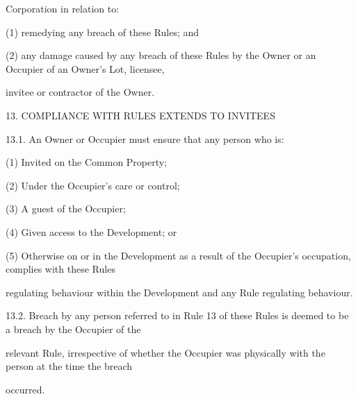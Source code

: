 \documentclass{article}
\begin{document}
{\fontsize{10.02}{1}Corporation in relation to: }

{\fontsize{9.962}{1}(1) remedying any breach of these Rules; and }

{\fontsize{9.962}{1}(2) any damage caused by any breach of these Rules by the Owner or an Occupier of an Owner’s Lot, licensee, }

{\fontsize{10.02}{1}invitee or contractor of the Owner. }



{\fontsize{9.99}{1}13. COMPLIANCE WITH RULES EXTENDS TO INVITEES }

{\fontsize{9.99}{1}13.1. An Owner or Occupier must ensure that any person who is: }

{\fontsize{9.962}{1}(1) Invited on the Common Property; }

{\fontsize{9.962}{1}(2) Under the Occupier’s care or control; }

{\fontsize{9.962}{1}(3) A guest of the Occupier; }

{\fontsize{9.962}{1}(4) Given access to the Development; or }

{\fontsize{9.962}{1}(5) Otherwise on or in the Development as a result of the Occupier’s occupation, complies with these Rules }

{\fontsize{10.02}{1}regulating behaviour within the Development and any Rule regulating behaviour. }

{\fontsize{9.99}{1}13.2. Breach by any person referred to in Rule 13 of these Rules is deemed to be a breach by the Occupier of the }

{\fontsize{10.02}{1}relevant Rule, irrespective of whether the Occupier was physically with the person at the time the breach }

{\fontsize{10.02}{1}occurred. }
\end{document}
